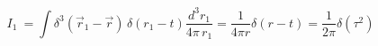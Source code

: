 \begin{equation}\label{rw5a}
I_{1}\ = \int \delta^{3}\!\left({\vec{r}_{1} -
\vec r}\right)\,\delta \left(r_{1}-t\right)
\frac{d^{3}r_{1}}{4\pi\,r_{1}} =
\frac{1}{4\pi r}
\delta\left(r-t\right)=\frac{1}{2\pi}\delta\left(\tau^2\right)
\end{equation}

